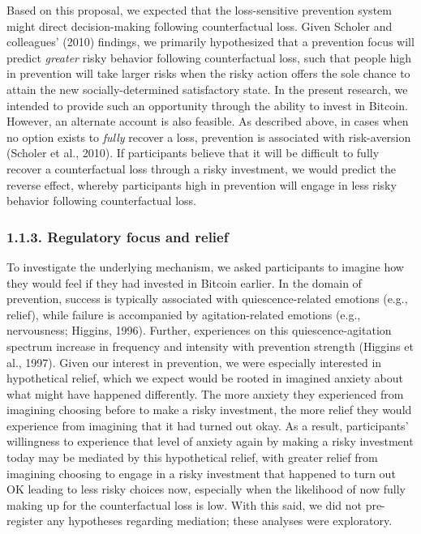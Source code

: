 \documentclass[man,floatsintext]{apa6}
\begin{document}
Based on this proposal, we expected that the loss-sensitive prevention system might direct decision-making following counterfactual loss. Given Scholer and colleagues' (2010) findings, we primarily hypothesized that a prevention focus will predict \emph{greater} risky behavior following counterfactual loss, such that people high in prevention will take larger risks when the risky action offers the sole chance to attain the new socially-determined satisfactory state. In the present research, we intended to provide such an opportunity through the ability to invest in Bitcoin. However, an alternate account is also feasible. As described above, in cases when no option exists to \emph{fully} recover a loss, prevention is associated with risk-aversion (Scholer et al., 2010). If participants believe that it will be difficult to fully recover a counterfactual loss through a risky investment, we would predict the reverse effect, whereby participants high in prevention will engage in less risky behavior following counterfactual loss.

\hypertarget{regulatory-focus-and-relief}{%
\subsubsection{1.1.3. Regulatory focus and relief}\label{regulatory-focus-and-relief}}

To investigate the underlying mechanism, we asked participants to imagine how they would feel if they had invested in Bitcoin earlier. In the domain of prevention, success is typically associated with quiescence-related emotions (e.g., relief), while failure is accompanied by agitation-related emotions (e.g., nervousness; Higgins, 1996). Further, experiences on this quiescence-agitation spectrum increase in frequency and intensity with prevention strength (Higgins et al., 1997). Given our interest in prevention, we were especially interested in hypothetical relief, which we expect would be rooted in imagined anxiety about what might have happened differently. The more anxiety they experienced from imagining choosing before to make a risky investment, the more relief they would experience from imagining that it had turned out okay. As a result, participants' willingness to experience that level of anxiety again by making a risky investment today may be mediated by this hypothetical relief, with greater relief from imagining choosing to engage in a risky investment that happened to turn out OK leading to less risky choices now, especially when the likelihood of now fully making up for the counterfactual loss is low. With this said, we did not pre-register any hypotheses regarding mediation; these analyses were exploratory.
\end{document}
